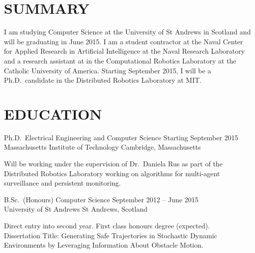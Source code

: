 \documentclass[line,margin]{cv}
\begin{document}
\address{Email: \href{mailto:wallar@mit.edu}{wallar@mit.edu}}
\address{Website: \href{http://aw204.host.cs.st-andrews.ac.uk}
{http://aw204.host.cs.st-andrews.ac.uk}}

\begin{resume}

\section{SUMMARY}

I am studying Computer Science at the University of St Andrews in Scotland and
will be graduating in June 2015. I am a student contractor at the Naval Center
for Applied Research in Artificial Intelligence at the Naval Research
Laboratory and a research assistant at in the Computational Robotics Laboratory
at the Catholic University of America. Starting September 2015, I will be a
Ph.D.\ candidate in the Distributed Robotics Laboratory at MIT.

\section{EDUCATION}

Ph.D.\ Electrical Engineering and Computer Science
\hfill Starting September 2015 \\
Massachusetts Institute of Technology \hfill Cambridge, Massachusetts
\begin{adjustwidth}{2.5em}{2.5em}

    Will be working under the supervision of Dr.\ Daniela Rus as part of the
    Distributed Robotics Laboratory working on algorithms for multi-agent
    surveillance and persistent monitoring.

\end{adjustwidth}

B.Sc.\ (Honours) Computer Science
\hfill September 2012 -- June 2015 \\
University of St Andrews \hfill St Andrews, Scotland
\begin{adjustwidth}{2.5em}{2.5em}

    Direct entry into second year. First class honours degree (expected).\\
    Dissertation Title: Generating Safe Trajectories in Stochastic Dynamic
    Environments by Leveraging Information About Obstacle Motion.

\end{adjustwidth}


\end{resume}
\end{document}
